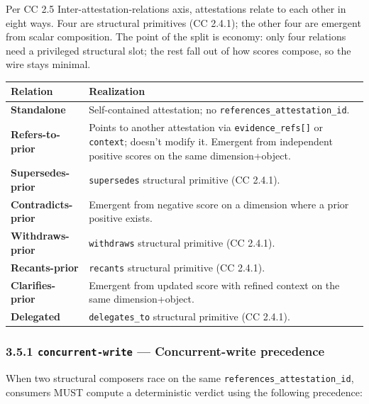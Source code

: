 \documentclass[11pt]{article}
\begin{document}
Per CC 2.5 Inter-attestation-relations axis, attestations relate to each other in eight ways. Four are structural primitives (CC 2.4.1); the other four are emergent from scalar composition. The point of the split is economy: only four relations need a privileged structural slot; the rest fall out of how scores compose, so the wire stays minimal.


{\footnotesize
\begin{longtable}{|p{8.0cm}|p{8.0cm}|}\hline
\textbf{Relation} & \textbf{Realization} \\ \hline\endhead
\textbf{Standalone} & Self-contained attestation; no \texttt{references\_attestation\_id}. \\ \hline
\textbf{Refers-to-prior} & Points to another attestation via \texttt{evidence\_refs[]} or \texttt{context}; doesn't modify it. Emergent from independent positive scores on the same dimension+object. \\ \hline
\textbf{Supersedes-prior} & \texttt{supersedes} structural primitive (CC 2.4.1). \\ \hline
\textbf{Contradicts-prior} & Emergent from negative score on a dimension where a prior positive exists. \\ \hline
\textbf{Withdraws-prior} & \texttt{withdraws} structural primitive (CC 2.4.1). \\ \hline
\textbf{Recants-prior} & \texttt{recants} structural primitive (CC 2.4.1). \\ \hline
\textbf{Clarifies-prior} & Emergent from updated score with refined context on the same dimension+object. \\ \hline
\textbf{Delegated} & \texttt{delegates\_to} structural primitive (CC 2.4.1). \\ \hline
\end{longtable}}


\subsubsection*{3.5.1 \texttt{concurrent-write} — Concurrent-write precedence}


When two structural composers race on the same \texttt{references\_attestation\_id}, consumers MUST compute a deterministic verdict using the following precedence:
\end{document}
